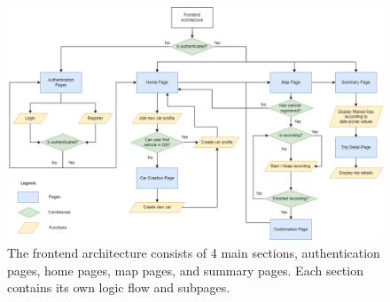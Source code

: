\documentclass[11pt, oneside]{article}
\begin{document}
\begin{figure}[!htb]
\vspace*{-0.5cm}
\centerline{\includegraphics[width=17cm]{img/architecture/Fuellytics-Frontend Architecture.png}}
\caption{\label{fig:frontend}The frontend architecture consists of 4 main sections, authentication pages, home pages, map pages, and summary pages. Each section contains its own logic flow and subpages.}
\end{figure}
\end{document}
